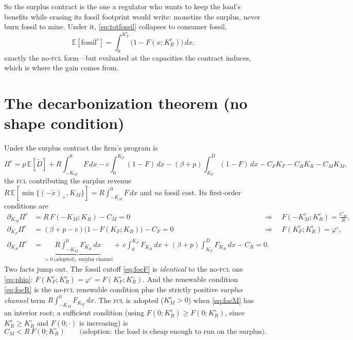 \documentclass[11pt,reqno]{amsart}
\theoremstyle{plain}
\theoremstyle{definition}
\theoremstyle{remark}
\newcommand{\KR}{K_R}
\newcommand{\KF}{K_F}
\newcommand{\KM}{K_M}
\newcommand{\KRc}{K_R^{c}}
\newcommand{\KFc}{K_F^{c}}
\newcommand{\KMc}{K_M^{c}}
\newcommand{\KRo}{K_R^{\circ}}
\newcommand{\KFo}{K_F^{\circ}}
\newcommand{\Dbar}{\bar D}
\newcommand{\CM}{C_M}
\newcommand{\CF}{C_F}
\newcommand{\CR}{C_R}
\newcommand{\bp}{\beta+p}
\newcommand{\FKR}{F_{\!\KR}}
\newcommand{\E}{\mathbb{E}}
\newcommand{\fossil}{\mathrm{fossil}}
\begin{document}
So the surplus contract is the one a regulator who wants to keep the load's
benefits while erasing its fossil footprint would write: monetize the surplus, never
burn fossil to mine. Under it, \eqref{eq:totfossil} collapses to consumer fossil,
\begin{equation}\label{eq:fosc}
  \E[\fossil^{c}]=\int_0^{\KFc}\big(1-F(x;\KRc)\big)\,dx ,
\end{equation}
exactly the no-\textsc{fcl} form---but evaluated at the capacities the contract
induces, which is where the gain comes from.

\section{The decarbonization theorem (no shape condition)}\label{sec:decarb}

Under the surplus contract the firm's program is
\begin{equation}\label{eq:Pic}
  \Pi^{c}=p\,\E[\tilde D]
  +R\!\!\int_{-\KM}^{0}\!\!\!F\,dx
  -c\!\!\int_{0}^{\KF}\!\!(1-F)\,dx
  -(\bp)\!\!\int_{\KF}^{\Dbar}\!\!(1-F)\,dx
  -\CF\KF-\CR\KR-\CM\KM ,
\end{equation}
the \textsc{fcl} contributing the surplus revenue $R\,\E[\min\{(-\tilde x)_+,\KM\}]
=R\int_{-\KM}^{0}F\,dx$ and \emph{no} fossil cost. Its first-order conditions are
\begin{align}
  \partial_{\KM}\Pi^{c}&=R\,F(-\KM;\KR)-\CM=0
     &&\Longrightarrow\quad F(-\KMc;\KRc)=\tfrac{\CM}{R},\label{eq:focM}\\
  \partial_{\KF}\Pi^{c}&=(\bp-c)\big(1-F(\KF;\KR)\big)-\CF=0
     &&\Longrightarrow\quad F(\KFc;\KRc)=\varphi^{\circ},\label{eq:focF}\\
  \partial_{\KR}\Pi^{c}&=\underbrace{R\!\!\int_{-\KM}^{0}\!\!\FKR\,dx}_{>0\ \text{(adopted)},\ \text{surplus channel}}
     +\,c\!\!\int_{0}^{\KF}\!\!\FKR\,dx+(\bp)\!\!\int_{\KF}^{\Dbar}\!\!\FKR\,dx-\CR=0.\label{eq:focR}
\end{align}
Two facts jump out. The fossil cutoff \eqref{eq:focF} is \emph{identical} to the
no-\textsc{fcl} one \eqref{eq:phio}: $F(\KFc;\KRc)=\varphi^{\circ}=F(\KFo;\KRo)$. And
the renewable condition \eqref{eq:focR} is the no-\textsc{fcl} renewable condition plus
the strictly positive \emph{surplus channel} term $R\int_{-\KM}^{0}\FKR\,dx$. The
\textsc{fcl} is adopted ($\KMc>0$) when \eqref{eq:focM} has an interior root; a
sufficient condition (using $F(0;\KRc)\ge F(0;\KRo)$, since $\KRc\ge\KRo$ and $F(0;\cdot)$
is increasing) is
\begin{equation}\label{eq:adopt}
  \CM<R\,F(0;\KRo)\qquad\text{(adoption: the load is cheap enough to run on the surplus).}
\end{equation}
\end{document}
